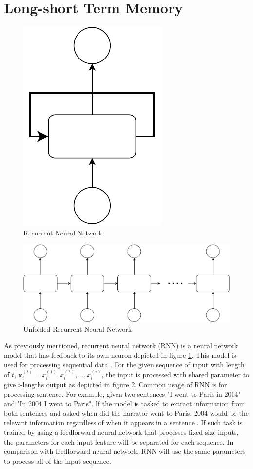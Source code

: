 \section{Long-short Term Memory}
    \begin{figure}[H]
        \centering
        \includegraphics[width=.15\linewidth]{images/rnn.pdf}
        \caption{Recurrent Neural Network}
        \label{fig:rnn}
    \end{figure}
    \begin{figure}[H]
        \centering
        \includegraphics[width=.6\linewidth]{images/unfolded_rnn.pdf}
        \caption{Unfolded Recurrent Neural Network}
        \label{fig:unfolded_rnn}
    \end{figure}
    As previously mentioned, recurrent neural network (RNN) is a
    neural network model that has feedback to its own neuron depicted
    in figure \ref{fig:rnn}. This model is used for processing sequential
    data \citep{Goodfellow-et-al-2016}. For the given sequence of
    input with length of $t$, $\mathbf{x}_i^{(t)} = x_i^{(1)}, x_i^{(2)},
    \dots, x_i^{(\tau)}$, the input is processed with shared parameter to
    give $t$-lengths output as depicted in figure
    \ref{fig:unfolded_rnn}. Common usage of RNN is for processing
    sentence. For example, given two sentences "I went to Paris in
    2004" and "In 2004 I went to Paris". If the model is tasked to
    extract information from both sentences and asked when did the
    narrator went to Paris, 2004 would be the relevant information
    regardless of when it appears in a sentence
    \citep{Goodfellow-et-al-2016}. If such task is trained by using a
    feedforward neural network that processes fixed size inputs, the
    parameters for each input feature will be separated for each
    sequence. In comparison with feedforward neural network, RNN will
    use the same parameters to process all of the input sequence. 

